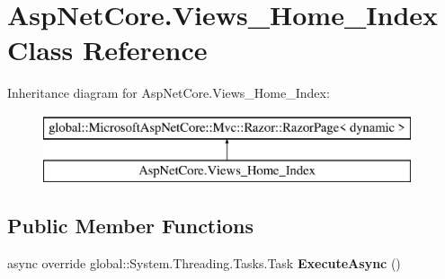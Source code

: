 \hypertarget{class_asp_net_core_1_1_views___home___index}{}\section{Asp\+Net\+Core.\+Views\+\_\+\+Home\+\_\+\+Index Class Reference}
\label{class_asp_net_core_1_1_views___home___index}
Inheritance diagram for Asp\+Net\+Core.\+Views\+\_\+\+Home\+\_\+\+Index\+:\begin{figure}[H]
\begin{center}
\leavevmode
\includegraphics[height=2.000000cm]{class_asp_net_core_1_1_views___home___index}
\end{center}
\end{figure}
\subsection*{Public Member Functions}
\begin{DoxyCompactItemize}
\item 
\mbox{\label{class_asp_net_core_1_1_views___home___index_a2e2b2029628bc7b5b597c00591249147}} 
async override global\+::\+System.\+Threading.\+Tasks.\+Task {\bfseries Execute\+Async} ()
\end{DoxyCompactItemize}
